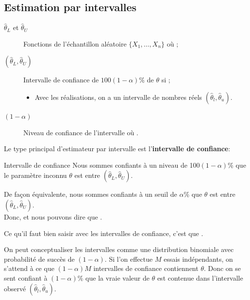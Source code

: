 \documentclass[10pt, french]{article}
\begin{document}
\begin{multicols*}{2}
\subsection{Estimation par intervalles}
\label{sec:int-estimation}
\begin{distributions}[Notation]
\begin{description}
	\item[$\hat{\theta}_{L}$ et $\hat{\theta}_{U}$]	Fonctions de l'échantillon aléatoire $\{X_{1}, \dots, X_{n}\}$ où ;
	\item[$(\hat{\theta}_{L}, \hat{\theta}_{U})$]	Intervalle de confiance de $100(1 - \alpha)\%$ de $\theta$ si ;
		\begin{itemize}
		\item	Avec les réalisations, on a un intervalle de nombres réels $(\hat{\theta}_{l}, \hat{\theta}_{u})$.
		\end{itemize}
	\item[$(1 - \alpha)$]	Niveau de confiance de l'intervalle où .
\end{description}
\end{distributions}

Le type principal d'estimateur par intervalle est l'\textbf{intervalle de confiance}:
\begin{algo}{Intervalle de confiance}
Nous sommes confiants à un niveau de 100$(1 - \alpha)$\% que le paramètre inconnu $\theta$ est entre $(\hat{\theta}_{L}, \hat{\theta}_{U})$. 

De façon équivalente, nous sommes confiants à un seuil de $\alpha$\% que $\theta$ est entre $(\hat{\theta}_{L}, \hat{\theta}_{U})$.\\

Donc,  et nous pouvons dire que  .
\end{algo}

Ce qu'il faut bien saisir avec les intervalles de confiance, c'est que .

On peut conceptualiser les intervalles comme une distribution binomiale avec probabilité de succès de $(1 - \alpha)$. Si l'on effectue $M$ essais indépendants, on s'attend à ce que $(1 - \alpha)M$ intervalles de confiance contiennent $\theta$. Donc on se sent confiant à $(1 - \alpha)\%$ que la vraie valeur de $\theta$ est contenue dans l'intervalle observé $(\hat{\theta}_{l}, \hat{\theta}_{u})$.


\end{multicols*}
\end{document}
